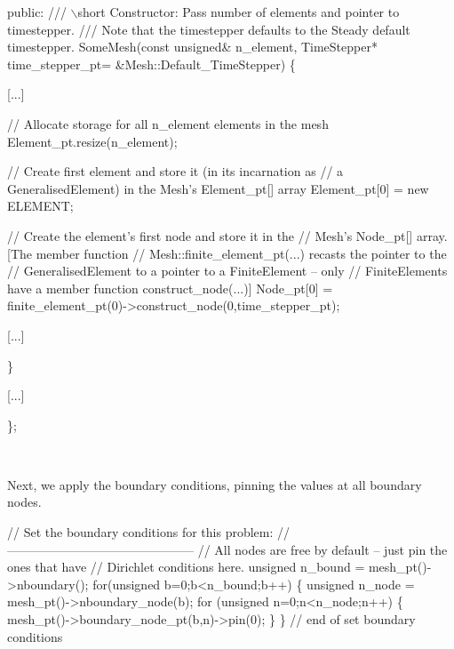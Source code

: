 \begin{longtabu}
\begin{DoxyCode}
\textcolor{keyword}{public}:
\textcolor{comment}{}
\textcolor{comment}{  /// \(\backslash\)short Constructor: Pass number of elements and pointer to timestepper.}
\textcolor{comment}{  /// Note that the timestepper defaults to the Steady default timestepper.}
\textcolor{comment}{}  SomeMesh(\textcolor{keyword}{const} \textcolor{keywordtype}{unsigned}& n\_element, TimeStepper* time\_stepper\_pt=
           &Mesh::Default\_TimeStepper)
   \{
   
     [...]


     \textcolor{comment}{// Allocate storage for all n\_element elements in the mesh}
     Element\_pt.resize(n\_element); 

     \textcolor{comment}{// Create first element and store it (in its incarnation as        }
     \textcolor{comment}{// a GeneralisedElement) in the Mesh's Element\_pt[] array}
     Element\_pt[0] = \textcolor{keyword}{new} ELEMENT;
 
     \textcolor{comment}{// Create the element's first node and store it in the}
     \textcolor{comment}{// Mesh's Node\_pt[] array. [The member function}
     \textcolor{comment}{// Mesh::finite\_element\_pt(...) recasts the pointer to the}
     \textcolor{comment}{// GeneralisedElement to a pointer to a FiniteElement -- only      }
     \textcolor{comment}{// FiniteElements have a member function construct\_node(...)]}
     Node\_pt[0] = finite\_element\_pt(0)->construct\_node(0,time\_stepper\_pt);

     [...]

   \}

[...]

\};
\end{DoxyCode}


\\
\end{longtabu}


Next, we apply the boundary conditions, pinning the values at all boundary nodes. 
\begin{DoxyCodeInclude}
 \textcolor{comment}{// Set the boundary conditions for this problem: }
 \textcolor{comment}{// ---------------------------------------------}
 \textcolor{comment}{// All nodes are free by default -- just pin the ones that have }
 \textcolor{comment}{// Dirichlet conditions here. }
 \textcolor{keywordtype}{unsigned} n\_bound = mesh\_pt()->nboundary();
 \textcolor{keywordflow}{for}(\textcolor{keywordtype}{unsigned} b=0;b<n\_bound;b++)
  \{
   \textcolor{keywordtype}{unsigned} n\_node = mesh\_pt()->nboundary\_node(b);
   \textcolor{keywordflow}{for} (\textcolor{keywordtype}{unsigned} n=0;n<n\_node;n++)
    \{
     mesh\_pt()->boundary\_node\_pt(b,n)->pin(0); 
    \}
  \} \textcolor{comment}{// end of set boundary conditions}

\end{DoxyCodeInclude}


